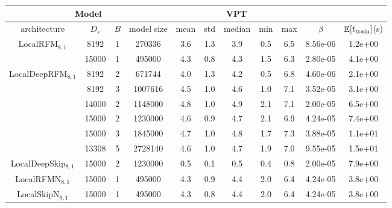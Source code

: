 \begin{table}[!htp]
    \centering
    \begin{tabular}{|c|c|c|c|c|c|c|c|c|c|c|} \hline
\multicolumn{4}{|c|}{Model} &\multicolumn{5}{c|}{VPT} & \multicolumn{2}{c|}{}\\ \hline
architecture & $D_r$ & $B$ & model size & mean & std & median & min & max &$\beta$ & $\mathbb{E}[t_{\rm train}]$(s)\\ \hline\hline
\multirow{2}{*}{LocalRFM$_{8,1}$} & 8192 & 1 & 270336 & 3.6 & 1.3 & 3.9 & 0.5 & 6.5 & 8.56e-06 & 1.2e+00\\ \cline{2-11}
 & \cellcolor{pink}15000 & \cellcolor{pink}1 & \cellcolor{pink}495000 & \cellcolor{pink}4.3 & \cellcolor{pink}0.8 & \cellcolor{pink}4.3 & \cellcolor{pink}1.5 & \cellcolor{pink}6.3 & \cellcolor{pink}2.80e-05 & \cellcolor{pink}4.1e+00\\ \cline{2-11}
\hline\hline
\multirow{6}{*}{LocalDeepRFM$_{8,1}$} & 8192 & 2 & 671744 & 4.0 & 1.3 & 4.2 & 0.5 & 6.8 & 4.60e-06 & 2.1e+00\\ \cline{2-11}
 & 8192 & 3 & 1007616 & 4.5 & 1.0 & 4.6 & 1.0 & 7.1 & 3.52e-05 & 3.1e+00\\ \cline{2-11}
 & \cellcolor{pink}14000 & \cellcolor{pink}2 & \cellcolor{pink}1148000 & \cellcolor{pink}4.8 & \cellcolor{pink}1.0 & \cellcolor{pink}4.9 & \cellcolor{pink}2.1 & \cellcolor{pink}7.1 & \cellcolor{pink}2.00e-05 & \cellcolor{pink}6.5e+00\\ \cline{2-11}
 & 15000 & 2 & 1230000 & 4.6 & 0.9 & 4.7 & 2.1 & 6.9 & 4.24e-05 & 7.4e+00\\ \cline{2-11}
 & 15000 & 3 & 1845000 & 4.7 & 1.0 & 4.8 & 1.7 & 7.3 & 3.88e-05 & 1.1e+01\\ \cline{2-11}
 & 13308 & 5 & 2728140 & 4.6 & 1.0 & 4.7 & 1.9 & 7.0 & 9.55e-05 & 1.5e+01\\ \cline{2-11}
\hline\hline
\multirow{1}{*}{LocalDeepSkip$_{8,1}$} & \cellcolor{pink}15000 & \cellcolor{pink}2 & \cellcolor{pink}1230000 & \cellcolor{pink}0.5 & \cellcolor{pink}0.1 & \cellcolor{pink}0.5 & \cellcolor{pink}0.4 & \cellcolor{pink}0.8 & \cellcolor{pink}2.00e-05 & \cellcolor{pink}7.9e+00\\ \cline{2-11}
\hline\hline
\multirow{1}{*}{LocalRFMN$_{8,1}$} & \cellcolor{pink}15000 & \cellcolor{pink}1 & \cellcolor{pink}495000 & \cellcolor{pink}4.3 & \cellcolor{pink}0.9 & \cellcolor{pink}4.4 & \cellcolor{pink}2.0 & \cellcolor{pink}6.4 & \cellcolor{pink}4.24e-05 & \cellcolor{pink}3.8e+00\\ \cline{2-11}
\hline\hline
\multirow{1}{*}{LocalSkipN$_{8,1}$} & \cellcolor{pink}15000 & \cellcolor{pink}1 & \cellcolor{pink}495000 & \cellcolor{pink}4.3 & \cellcolor{pink}0.8 & \cellcolor{pink}4.4 & \cellcolor{pink}2.0 & \cellcolor{pink}6.4 & \cellcolor{pink}4.24e-05 & \cellcolor{pink}3.8e+00\\ \cline{2-11}

\end{tabular}
\end{table}
